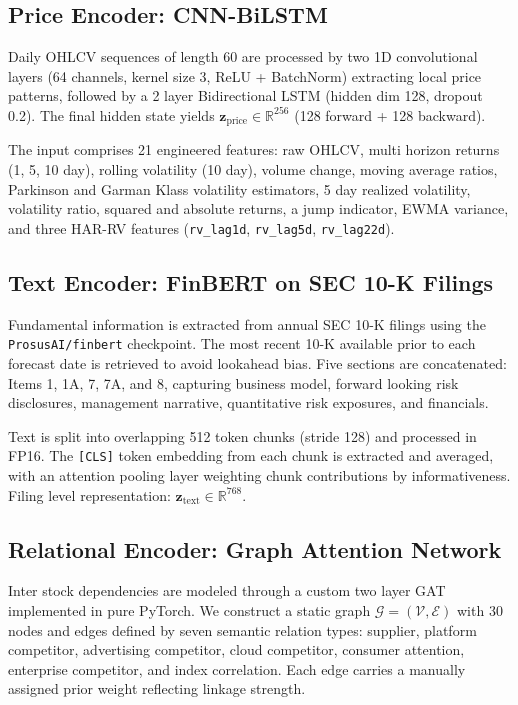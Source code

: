 \documentclass[10pt, twocolumn, a4paper]{article}
\begin{document}
\subsection{Price Encoder: CNN{-}BiLSTM}

Daily OHLCV sequences of length 60 are processed by two 1D convolutional
layers (64 channels, kernel size 3, ReLU + BatchNorm) extracting local
price patterns, followed by a 2 layer Bidirectional LSTM (hidden dim 128,
dropout 0.2). The final hidden state yields
$\mathbf{z}_{\text{price}} \in \mathbb{R}^{256}$ (128 forward + 128 backward).

The input comprises 21 engineered features: raw OHLCV, multi horizon
returns (1, 5, 10 day), rolling volatility (10 day), volume change, moving
average ratios, Parkinson and Garman Klass volatility estimators, 5 day
realized volatility, volatility ratio, squared and absolute returns, a
jump indicator, EWMA variance, and three HAR{-}RV features
(\texttt{rv\_lag1d}, \texttt{rv\_lag5d}, \texttt{rv\_lag22d}).

\subsection{Text Encoder: FinBERT on SEC 10{-}K Filings}

Fundamental information is extracted from annual SEC 10{-}K filings using
the \texttt{ProsusAI/finbert} checkpoint. The most recent 10{-}K available
prior to each forecast date is retrieved to avoid lookahead bias. Five
sections are concatenated: Items 1, 1A, 7, 7A, and 8, capturing business
model, forward looking risk disclosures, management narrative, quantitative
risk exposures, and financials.

Text is split into overlapping 512 token chunks (stride 128) and processed
in FP16. The \texttt{[CLS]} token embedding from each chunk is extracted and
averaged, with an attention pooling layer weighting chunk contributions by
informativeness. Filing level representation:
$\mathbf{z}_{\text{text}} \in \mathbb{R}^{768}$.

\subsection{Relational Encoder: Graph Attention Network}

Inter stock dependencies are modeled through a custom two layer GAT
implemented in pure PyTorch. We construct a static graph
$\mathcal{G} = (\mathcal{V}, \mathcal{E})$ with 30 nodes and edges defined
by seven semantic relation types: supplier, platform competitor, advertising
competitor, cloud competitor, consumer attention, enterprise competitor, and
index correlation. Each edge carries a manually assigned prior weight
reflecting linkage strength.
\end{document}
